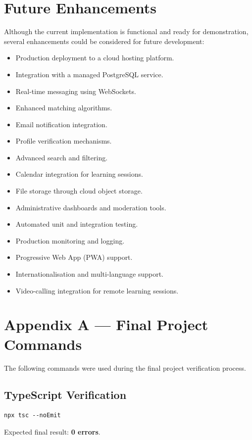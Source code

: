 \documentclass[12pt,a4paper]{report}
\begin{document}
\chapter{Future Enhancements}

Although the current implementation is functional and ready for demonstration,
several enhancements could be considered for future development:

\begin{itemize}[noitemsep]
  \item Production deployment to a cloud hosting platform.
  \item Integration with a managed PostgreSQL service.
  \item Real-time messaging using WebSockets.
  \item Enhanced matching algorithms.
  \item Email notification integration.
  \item Profile verification mechanisms.
  \item Advanced search and filtering.
  \item Calendar integration for learning sessions.
  \item File storage through cloud object storage.
  \item Administrative dashboards and moderation tools.
  \item Automated unit and integration testing.
  \item Production monitoring and logging.
  \item Progressive Web App (PWA) support.
  \item Internationalisation and multi-language support.
  \item Video-calling integration for remote learning sessions.
\end{itemize}

\chapter*{Appendix A --- Final Project Commands}

The following commands were used during the final project verification process.

\section{TypeScript Verification}
\begin{lstlisting}
npx tsc --noEmit
\end{lstlisting}
Expected final result: \textbf{0 errors}.
\end{document}
